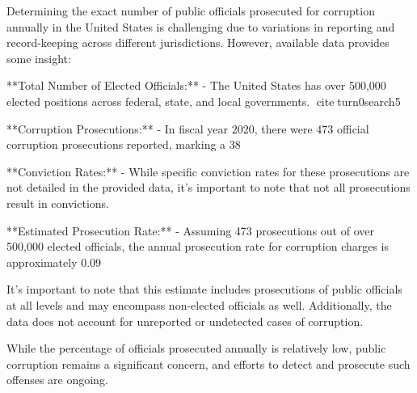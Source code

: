 Determining the exact number of public officials prosecuted for corruption annually in the United States is challenging due to variations in reporting and record-keeping across different jurisdictions. However, available data provides some insight:

**Total Number of Elected Officials:**
- The United States has over 500,000 elected positions across federal, state, and local governments. citeturn0search5

**Corruption Prosecutions:**
- In fiscal year 2020, there were 473 official corruption prosecutions reported, marking a 38%

**Conviction Rates:**
- While specific conviction rates for these prosecutions are not detailed in the provided data, it's important to note that not all prosecutions result in convictions.

**Estimated Prosecution Rate:**
- Assuming 473 prosecutions out of over 500,000 elected officials, the annual prosecution rate for corruption charges is approximately 0.09%

It's important to note that this estimate includes prosecutions of public officials at all levels and may encompass non-elected officials as well. Additionally, the data does not account for unreported or undetected cases of corruption.

While the percentage of officials prosecuted annually is relatively low, public corruption remains a significant concern, and efforts to detect and prosecute such offenses are ongoing. 